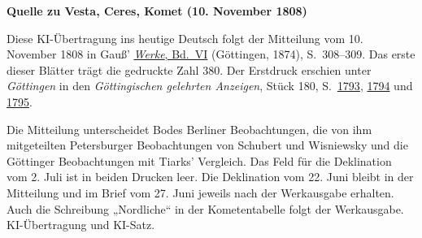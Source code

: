 \clearpage\thispagestyle{empty}
\begin{center}\textbf{Quelle zu Vesta, Ceres, Komet (10. November 1808)}\end{center}
\noindent Diese KI-Übertragung ins heutige Deutsch folgt der Mitteilung vom 10. November 1808 in Gauß’ \href{https://gdz.sub.uni-goettingen.de/id/PPN236007467}{\textit{Werke}, Bd.~VI} (Göttingen, 1874), S.~308--309. Das erste dieser Blätter trägt die gedruckte Zahl 380. Der Erstdruck erschien unter \textit{Göttingen} in den \textit{Göttingischen gelehrten Anzeigen}, Stück 180, S.~\href{https://manifests.sub.uni-goettingen.de/iiif/image/gdz:PPN319721507_1808:00001799/full/1600,/0/default.jpg}{1793}, \href{https://manifests.sub.uni-goettingen.de/iiif/image/gdz:PPN319721507_1808:00001800/full/1600,/0/default.jpg}{1794} und \href{https://manifests.sub.uni-goettingen.de/iiif/image/gdz:PPN319721507_1808:00001801/full/1600,/0/default.jpg}{1795}.
\par\medskip
Die Mitteilung unterscheidet Bodes Berliner Beobachtungen, die von ihm mitgeteilten Petersburger Beobachtungen von Schubert und Wisniewsky und die Göttinger Beobachtungen mit Tiarks’ Vergleich. Das Feld für die Deklination vom 2. Juli ist in beiden Drucken leer. Die Deklination vom 22. Juni bleibt in der Mitteilung und im Brief vom 27. Juni jeweils nach der Werkausgabe erhalten. Auch die Schreibung „Nordliche“ in der Kometentabelle folgt der Werkausgabe. KI-Übertragung und KI-Satz.
\clearpage
